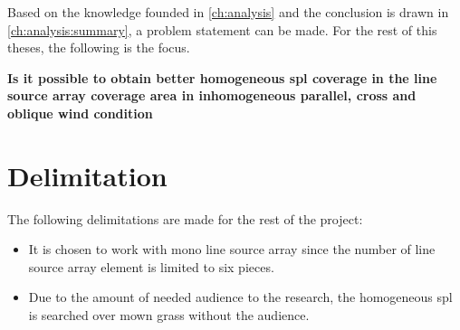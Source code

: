 Based on the knowledge founded in \autoref{ch:analysis} and the conclusion is drawn in \autoref{ch:analysis:summary}, a problem statement can be made. For the rest of this theses, the following is the focus.


\textbf{Is it possible to obtain better homogeneous \gls{spl} coverage in the line source array coverage area in inhomogeneous parallel, cross and oblique wind condition}



\section{Delimitation}
The following delimitations are made for the rest of the project:

\begin{itemize}
\item It is chosen to work with mono line source array since the number of line source array element is limited to six pieces.
\item Due to the amount of needed audience to the research, the homogeneous \gls{spl} is searched over mown grass without the audience.
\end{itemize}